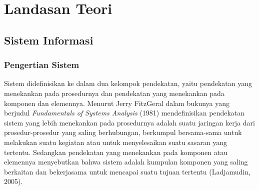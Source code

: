 \section{Landasan Teori}

\subsection{Sistem Informasi}

    \subsubsection{Pengertian Sistem}
    Sistem didefinisikan ke dalam dua kelompok pendekatan, yaitu pendekatan yang menekankan pada prosedurnya dan pendekatan yang menekankan pada komponen dan elemennya. Menurut Jerry FitzGeral dalam bukunya yang berjudul \emph{Fundamentals of Systems Analysis} (1981) mendefinisikan pendekatan sistem yang lebih menekankan pada prosedurnya adalah suatu jaringan kerja dari prosedur-prosedur yang saling berhubungan, berkumpul bersama-sama untuk melakukan suatu kegiatan atau untuk menyelesaikan suatu sasaran yang tertentu. Sedangkan pendekatan yang menekankan pada komponen atau elemennya menyebutkan bahwa sistem adalah kumpulan komponen yang saling berkaitan dan bekerjasama untuk mencapai suatu tujuan tertentu (Ladjamudin, 2005).
    
